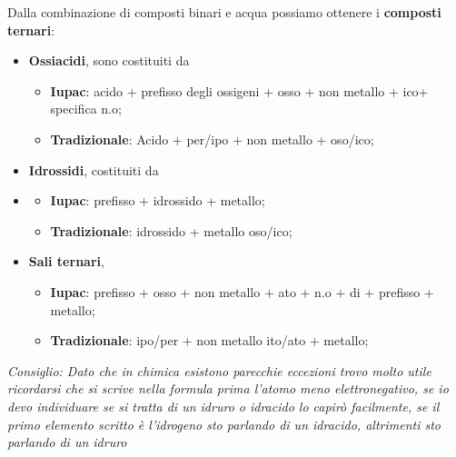 \documentclass[11pt, a4paper, openright]{book}
\begin{document}
Dalla combinazione di composti binari e acqua possiamo ottenere i \textbf{composti ternari}:
\begin{itemize}
    \item \textbf{Ossiacidi}, sono costituiti da  
    \begin{itemize}
        \item \textbf{Iupac}: acido + prefisso degli ossigeni + osso + non metallo + ico+ specifica n.o;
        \item \textbf{Tradizionale}: Acido + per/ipo + non metallo + oso/ico;
    \end{itemize}
    \item \textbf{Idrossidi}, costituiti da 
    \item 
    \begin{itemize}
        \item \textbf{Iupac}: prefisso + idrossido + metallo;
        \item \textbf{Tradizionale}: idrossido + metallo oso/ico;
        \end{itemize}
    \item \textbf{Sali ternari},  
    \begin{itemize}
        \item \textbf{Iupac}: prefisso + osso + non metallo + ato + n.o + di + prefisso + metallo;
        \item \textbf{Tradizionale}: ipo/per + non metallo ito/ato + metallo;
        \end{itemize}
\end{itemize}
\textit{ Consiglio: Dato che in chimica esistono parecchie eccezioni trovo molto utile ricordarsi che si scrive nella formula prima l'atomo meno elettronegativo, se io devo individuare se si tratta di un idruro  o idracido lo capirò facilmente, se il primo elemento scritto è l'idrogeno sto parlando di un idracido, altrimenti sto parlando di un idruro}
\newpage
\end{document}
